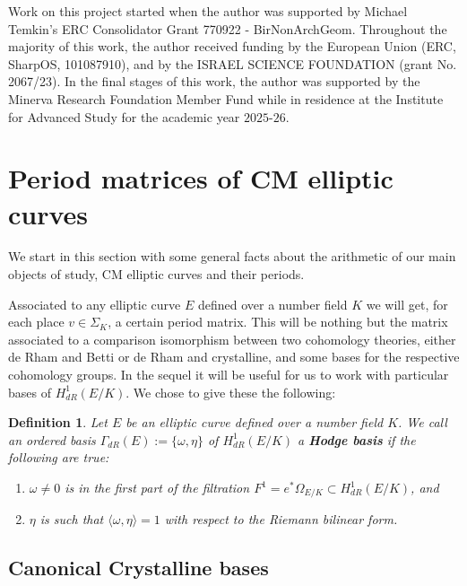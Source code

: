 \documentclass[12pt,twoside,a4paper]{article}
\theoremstyle{plain}%
\newtheorem{definition}[theorem]{Definition} %
\begin{document}
Work on this project started when the author was supported by Michael Temkin's ERC Consolidator Grant 770922 - BirNonArchGeom. Throughout the majority of this work, the author received funding by the European Union (ERC, SharpOS, 101087910), and by the ISRAEL SCIENCE FOUNDATION (grant No. 2067/23). In the final stages of this work, the author was supported by the Minerva Research Foundation Member Fund while in residence at the Institute for Advanced Study for the academic year $2025$-$26$. 

\section{Period matrices of CM elliptic curves}\label{section:background}

We start in this section with some general facts about the arithmetic of our main objects of study, CM elliptic curves and their periods.

Associated to any elliptic curve $E$ defined over a number field $K$ we will get, for each place $v\in\Sigma_{K}$, a certain period matrix. This will be nothing but the matrix associated to a comparison isomorphism between two cohomology theories, either de Rham and Betti or de Rham and crystalline, and some bases for the respective cohomology groups. In the sequel it will be useful for us to work with particular bases of $H^1_{dR}(E/K)$. We chose to give these the following:
\begin{definition}\label{hodgebasis}Let $E$ be an elliptic curve defined over a number field $K$.  We call an ordered basis $\Gamma_{dR}(E):=\{\omega,\eta\}$ of $H^1_{dR}(E/K)$ a \textbf{Hodge basis} if the following are true:
	\begin{enumerate}
		\item $\omega\neq 0$ is in the first part of the filtration $F^1=e^{*}\Omega_{E/K}\subset H^1_{dR}(E/K)$, and 
		
		\item $\eta$ is such that $\langle \omega,\eta\rangle=1$ with respect to the Riemann bilinear form.
	\end{enumerate}
\end{definition}

\subsection{Canonical Crystalline bases}\label{section:bases}
\end{document}
